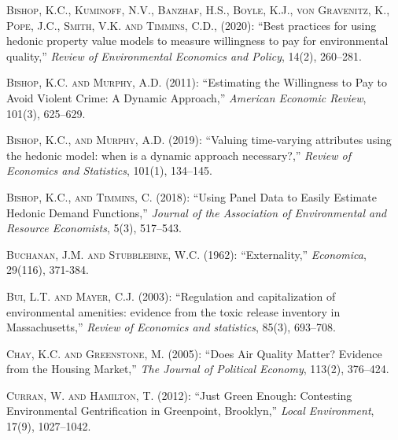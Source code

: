 \documentclass[ecta,nameyear,draft]{econsocart}
\theoremstyle{plain}
\theoremstyle{remark}
\begin{document}
\begin{thebibliography}{}
\textsc{Bishop, K.C., Kuminoff, N.V., Banzhaf, H.S., Boyle, K.J., von Gravenitz, K., Pope, J.C., Smith, V.K. and Timmins, C.D., } (2020):
``Best practices for using hedonic property value models to measure willingness to pay for environmental quality,''
\textit{Review of Environmental Economics and Policy}, 14(2), 260--281.
\endbibitem

\textsc{Bishop, K.C. and Murphy, A.D.} (2011):
``Estimating the Willingness to Pay to Avoid Violent Crime: A Dynamic Approach,''
\textit{American Economic Review}, 101(3), 625--629.
\endbibitem

\textsc{Bishop, K.C., and Murphy, A.D.} (2019):
``Valuing time-varying attributes using the hedonic model: when is a dynamic approach necessary?,''
\textit{Review of Economics and Statistics}, 101(1), 134--145.
\endbibitem

\textsc{Bishop, K.C., and Timmins, C.} (2018):
``Using Panel Data to Easily Estimate Hedonic Demand Functions,''
\textit{Journal of the Association of Environmental and Resource Economists}, 5(3), 517--543.
\endbibitem

\textsc{Buchanan, J.M. and Stubblebine, W.C.} (1962):
``Externality,''
\textit{Economica}, 29(116), 371-384.
\endbibitem

\textsc{Bui, L.T. and Mayer, C.J.} (2003):
``Regulation and capitalization of environmental amenities: evidence from the toxic release inventory in Massachusetts,''
\textit{Review of Economics and statistics}, 85(3), 693--708.
\endbibitem


\textsc{Chay, K.C. and Greenstone, M.} (2005):
``Does Air Quality Matter? Evidence from the Housing Market,''
\textit{The Journal of Political Economy}, 113(2), 376--424.
\endbibitem

 
\textsc{Curran, W. and Hamilton, T.} (2012):
``Just Green Enough: Contesting Environmental Gentrification in Greenpoint, Brooklyn,''
\textit{Local Environment}, 17(9), 1027--1042.
\endbibitem


\end{thebibliography}
\end{document}

